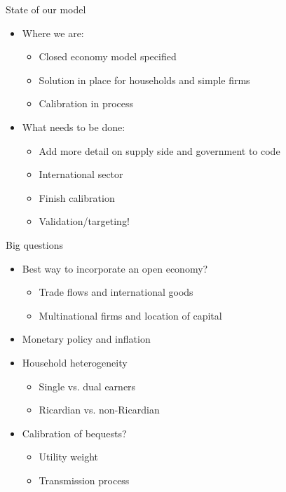 \documentclass{beamer}
\begin{document}
\begin{frame}{State of our model}
  \begin{itemize}
    \item Where we are:
      \vspace{4mm}
  	  \begin{itemize}
      	\item Closed economy model specified
	      \vspace{2mm}
        \item Solution in place for households and simple firms
      	\vspace{2mm}
        \item Calibration in process
  	  \end{itemize}
    \vspace{6mm}
    \item What needs to be done:
      \vspace{4mm}
 	    \begin{itemize}
	      \item Add more detail on supply side and government to code
	      \vspace{2mm}
        \item International sector
	      \vspace{2mm}
        \item Finish calibration
	      \vspace{2mm}
        \item Validation/targeting!
	    \end{itemize}
  \end{itemize}
\end{frame}

      \begin{frame}{Big questions}
  \begin{itemize}
\item Best way to incorporate an open economy?
	\begin{itemize}
	\item Trade flows and international goods
	\item Multinational firms and location of capital
	\end{itemize}
\item Monetary policy and inflation
\item Household heterogeneity
	\begin{itemize}
	\item Single vs. dual earners
	\item Ricardian vs. non-Ricardian
	\end{itemize}
\item Calibration of bequests?
	\begin{itemize}
	\item Utility weight
	\item Transmission process
	\end{itemize}
\end{itemize}
\end{frame}
\end{document}
